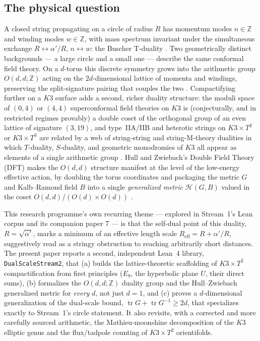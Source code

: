 \documentclass[11pt,a4paper]{article}
\theoremstyle{remark}
\begin{document}
\subsection{The physical question}
A closed string propagating on a circle of radius $R$ has momentum modes $n\in\mathbb{Z}$ and
winding modes $w\in\mathbb{Z}$, with mass spectrum invariant under the simultaneous exchange
$R\leftrightarrow \alpha'/R$, $n\leftrightarrow w$: the Buscher T-duality
\cite{Buscher1987,Buscher1988}. Two geometrically distinct backgrounds --- a large circle and a
small one --- describe the same conformal field theory. On a $d$-torus this discrete symmetry
grows into the arithmetic group $O(d,d;\mathbb{Z})$ acting on the $2d$-dimensional lattice of
momenta and windings, preserving the split-signature pairing that couples the two
\cite{Narain1986,GiveonPorratiRabinovici1994}. Compactifying further on a $K3$ surface adds a
second, richer duality structure: the moduli space of $(0,4)$ or $(4,4)$ superconformal field
theories on $K3$ is (conjecturally, and in restricted regimes provably) a double coset of the
orthogonal group of an even lattice of signature $(3,19)$, and type~IIA/IIB and heterotic strings
on $K3\times T^2$ or $K3\times T^3$ are related by a web of string-string and string-M-theory
dualities in which $T$-duality, $S$-duality, and geometric monodromies of $K3$ all appear as
elements of a single arithmetic group \cite{Aspinwall1996}. Hull and Zwiebach's Double Field
Theory (DFT) makes the $O(d,d)$ structure manifest at the level of the low-energy effective
action, by doubling the torus coordinates and packaging the metric $G$ and Kalb--Ramond field
$B$ into a single \emph{generalized metric} $\mathcal{H}(G,B)$ valued in the coset
$O(d,d)/(O(d)\times O(d))$ \cite{HullZwiebach2009}.

This research programme's own recurring theme --- explored in Stream~1's Lean corpus and its
companion paper 7 \cite{Callens2026Paper7} --- is that the self-dual point of this duality,
$R=\sqrt{\alpha'}$, marks a minimum of an effective length scale $R_{\mathrm{eff}}=R+\alpha'/R$,
suggestively read as a stringy obstruction to reaching arbitrarily short distances. The present
paper reports a second, independent Lean~4 library, \texttt{DualScaleStream2}, that (a) builds the
lattice-theoretic scaffolding of $K3\times T^2$ compactification from first principles ($E_8$,
the hyperbolic plane $U$, their direct sums), (b) formalizes the $O(d,d;\mathbb{Z})$ duality group
and the Hull--Zwiebach generalized metric for \emph{every} $d$, not just $d=1$, and (c) proves a
$d$-dimensional generalization of the dual-scale bound, $\operatorname{tr}G+\operatorname{tr}G^{-1}\ge 2d$,
that specializes exactly to Stream~1's circle statement. It also revisits, with a corrected and
more carefully sourced arithmetic, the Mathieu-moonshine decomposition of the $K3$ elliptic genus
and the flux/tadpole counting of $K3\times T^2$ orientifolds.
\end{document}
